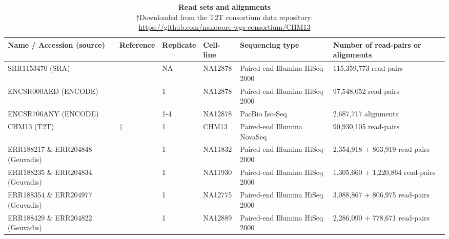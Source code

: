 \documentclass[11pt]{ucthesis}
\begin{document}
\begin{table}[H]
\ssp
\footnotesize
\begin{tabular}{L{0.15\textwidth}| L{0.1\textwidth} | L{0.09\textwidth} | L{0.09\textwidth} | L{0.17\textwidth} | R{0.16\textwidth}}
\textbf{Name / Accession (source)} & \textbf{Reference} & \textbf{Replicate} & \textbf{Cell-line} & \textbf{Sequencing type} & \textbf{Number of read-pairs or alignments} \\
\midrule
SRR1153470 (SRA) & \cite{tilgner2014defining} & NA & NA12878 & Paired-end Illumina HiSeq 2000 & 115,359,773 read-pairs \\
\midrule
ENCSR000AED (ENCODE) & \cite{encode2012integrated,davis2017encycolopedia} & 1 & NA12878 & Paired-end Illumina HiSeq 2000 & 97,548,052 read-pairs \\
\midrule
ENCSR706ANY (ENCODE) & \cite{encode2012integrated,davis2017encycolopedia} & 1-4 & NA12878 & PacBio Iso-Seq & 2,687,717 alignments \\
\midrule
CHM13 (T2T) & $\dag$ & 1 & CHM13 & Paired-end Illumina NovaSeq & 90,930,105  read-pairs \\ 
\midrule
ERR188217 \& ERR204848 (Geuvadis) & \cite{lappalainen2013transcriptome} & 1 & NA11832 & Paired-end Illumina HiSeq 2000 & 2,354,918 + 863,919 read-pairs \\
\midrule
ERR188235 \& ERR204834 (Geuvadis) & \cite{lappalainen2013transcriptome} & 1 & NA11930 & Paired-end Illumina HiSeq 2000 & 1,305,660 + 1,220,864 read-pairs \\
\midrule
ERR188354 \& ERR204977 (Geuvadis) & \cite{lappalainen2013transcriptome} & 1 & NA12775 & Paired-end Illumina HiSeq 2000 & 3,088,867 + 806,975 read-pairs \\
\midrule
ERR188429 \& ERR204822 (Geuvadis) & \cite{lappalainen2013transcriptome} & 1 & NA12889 & Paired-end Illumina HiSeq 2000 & 2,286,090 + 778,671 read-pairs
\end{tabular}
\caption{\textbf{Read sets and alignments}\\
$\dag$Downloaded from the T2T consortium data repository:\\ \protect\url{https://github.com/nanopore-wgs-consortium/CHM13}
}
\label{tab:read-sets}
\end{table}
\end{document}
